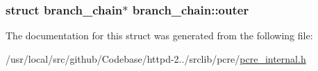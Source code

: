 \subsubsection[{\texorpdfstring{outer}{outer}}]{\setlength{\rightskip}{0pt plus 5cm}struct {\bf branch\+\_\+chain}$\ast$ branch\+\_\+chain\+::outer}\hypertarget{structbranch__chain_a31ea7a80e9f42fabbcd2c63103f8528a}{}\label{structbranch__chain_a31ea7a80e9f42fabbcd2c63103f8528a}


The documentation for this struct was generated from the following file\+:\begin{DoxyCompactItemize}
\item 
/usr/local/src/github/\+Codebase/httpd-\/2../srclib/pcre/\hyperlink{pcre__internal_8h}{pcre\+\_\+internal.\+h}\end{DoxyCompactItemize}
